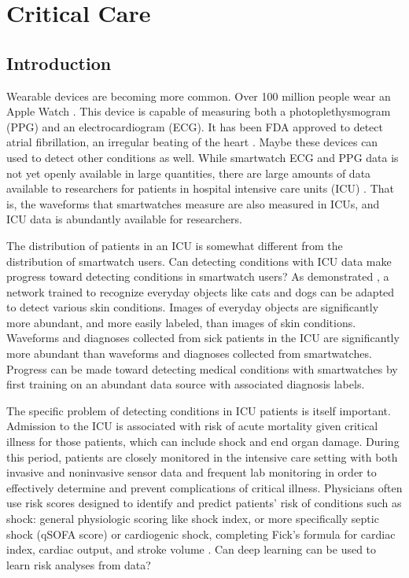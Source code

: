 

\chapter{Critical Care}

\section{Introduction}
Wearable devices are becoming more common.  Over 100 million people wear an Apple Watch \cite{cybart_2021}.  This device is capable of measuring both a photoplethysmogram (PPG) and an electrocardiogram (ECG).  It has been FDA approved to detect atrial fibrillation, an irregular beating of the heart \cite{perez2019large}.  Maybe these devices can used to detect other conditions as well.  While smartwatch ECG and PPG data is not yet openly available in large quantities, there are large amounts of data available to researchers for patients in hospital intensive care units (ICU) \cite{johnson2016mimic}.  That is, the waveforms that smartwatches measure are also measured in ICUs, and ICU data is abundantly available for researchers.

The distribution of patients in an ICU is somewhat different from the distribution of smartwatch users.  Can detecting conditions with ICU data make progress toward detecting conditions in smartwatch users?  As demonstrated \cite{kuprel2017dermatologist}, a network trained to recognize everyday objects like cats and dogs can be adapted to detect various skin conditions.  Images of everyday objects are significantly more abundant, and more easily labeled, than images of skin conditions.  Waveforms and diagnoses collected from sick patients in the ICU are significantly more abundant than waveforms and diagnoses collected from smartwatches.  Progress can be made toward detecting medical conditions with smartwatches by first training on an abundant data source with associated diagnosis labels.  

The specific problem of detecting conditions in ICU patients is itself important.  Admission to the ICU is associated with risk of acute mortality given critical illness for those patients, which can include shock and end organ damage. During this period, patients are closely monitored in the intensive care setting with both invasive and noninvasive sensor data and frequent lab monitoring in order to effectively determine and prevent complications of critical illness.  Physicians often use risk scores designed to identify and predict patients’ risk of conditions such as shock: general physiologic scoring like shock index, or more specifically septic shock (qSOFA score) \cite{seymour2016assessment} or cardiogenic shock, completing Fick’s formula for cardiac index, cardiac output, and stroke volume \cite{fick1870ueber}.  Can deep learning can be used to learn risk analyses from data?

